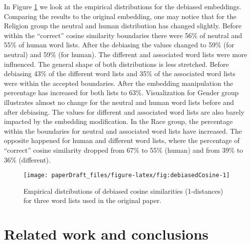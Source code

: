 \documentclass[
  10pt,
  dvipsnames,enabledeprecatedfontcommands]{scrartcl}
\begin{document}
In Figure \ref{fig:empiricalDebiased} we look at the empirical
distributions for the debiased embeddings. Comparing the results to the
original embedding, one may notice that for the Religion group the
neutral and human distribution has changed slightly. Before within the
``correct'' cosine similarity boundaries there were 56\% of neutral and
55\% of human word lists. After the debiasing the values changed to 59\%
(for neutral) and 59\% (for human). The different and associated word
lists were more influenced. The general shape of both distributions is
less stretched. Before debiasing 43\% of the different word lists and
35\% of the associated word lists were within the accepted boundaries.
After the embedding manipulation the percentage has increased for both
lists to 63\%. Visualization for Gender group illustrates almost no
change for the neutral and human word lists before and after debiasing.
The values for different and associated word lists are also barely
impacted by the embedding modification. In the Race group, the
percentage within the boundaries for neutral and associated word lists
have increased. The opposite happened for human and different word
lists, where the percentage of ``correct'' cosine similarity dropped
from 67\% to 55\% (human) and from 39\% to 36\% (different).

\pagebreak

\begin{figure}[H]

\begin{center}\texttt{[image: paperDraft\_files/figure-latex/fig:debiasedCosine-1]} \end{center}
\caption{Empirical distributions of debiased cosine similarities (1-distances) for three word lists used in  the original paper.}
\label{fig:empiricalDebiased}
\end{figure}

\hypertarget{related-work-and-conclusions}{%
\section{Related work and
conclusions}\label{related-work-and-conclusions}}
\end{document}
